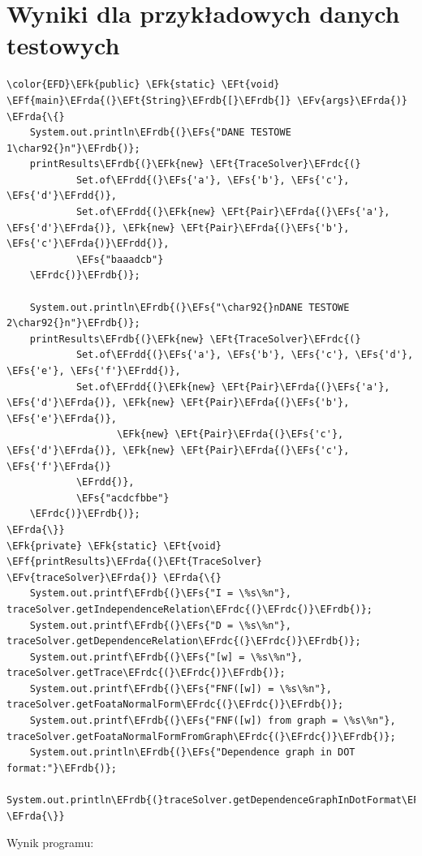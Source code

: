 \documentclass[11pt]{article}
\newcommand{\EFs}[1]{\textcolor{EFs}{#1}} %
\newcommand{\EFk}[1]{\textcolor{EFk}{#1}} %
\newcommand{\EFf}[1]{\textcolor{EFf}{#1}} %
\newcommand{\EFv}[1]{\textcolor{EFv}{#1}} %
\newcommand{\EFt}[1]{\textcolor{EFt}{#1}} %
\newcommand{\EFrda}[1]{#1} %
\newcommand{\EFrdb}[1]{\textcolor{EFrdb}{#1}} %
\newcommand{\EFrdc}[1]{\textcolor{EFrdc}{#1}} %
\newcommand{\EFrdd}[1]{\textcolor{EFrdd}{#1}} %
\begin{document}
\section*{Wyniki dla przykładowych danych testowych}
\label{sec:orga82053b}
\begin{Code}
\begin{Verbatim}
\color{EFD}\EFk{public} \EFk{static} \EFt{void} \EFf{main}\EFrda{(}\EFt{String}\EFrdb{[}\EFrdb{]} \EFv{args}\EFrda{)} \EFrda{\{}
    System.out.println\EFrdb{(}\EFs{"DANE TESTOWE 1\char92{}n"}\EFrdb{)};
    printResults\EFrdb{(}\EFk{new} \EFt{TraceSolver}\EFrdc{(}
            Set.of\EFrdd{(}\EFs{'a'}, \EFs{'b'}, \EFs{'c'}, \EFs{'d'}\EFrdd{)},
            Set.of\EFrdd{(}\EFk{new} \EFt{Pair}\EFrda{(}\EFs{'a'}, \EFs{'d'}\EFrda{)}, \EFk{new} \EFt{Pair}\EFrda{(}\EFs{'b'}, \EFs{'c'}\EFrda{)}\EFrdd{)},
            \EFs{"baaadcb"}
    \EFrdc{)}\EFrdb{)};

    System.out.println\EFrdb{(}\EFs{"\char92{}nDANE TESTOWE 2\char92{}n"}\EFrdb{)};
    printResults\EFrdb{(}\EFk{new} \EFt{TraceSolver}\EFrdc{(}
            Set.of\EFrdd{(}\EFs{'a'}, \EFs{'b'}, \EFs{'c'}, \EFs{'d'}, \EFs{'e'}, \EFs{'f'}\EFrdd{)},
            Set.of\EFrdd{(}\EFk{new} \EFt{Pair}\EFrda{(}\EFs{'a'}, \EFs{'d'}\EFrda{)}, \EFk{new} \EFt{Pair}\EFrda{(}\EFs{'b'}, \EFs{'e'}\EFrda{)},
                   \EFk{new} \EFt{Pair}\EFrda{(}\EFs{'c'}, \EFs{'d'}\EFrda{)}, \EFk{new} \EFt{Pair}\EFrda{(}\EFs{'c'}, \EFs{'f'}\EFrda{)}
            \EFrdd{)},
            \EFs{"acdcfbbe"}
    \EFrdc{)}\EFrdb{)};
\EFrda{\}}
\EFk{private} \EFk{static} \EFt{void} \EFf{printResults}\EFrda{(}\EFt{TraceSolver} \EFv{traceSolver}\EFrda{)} \EFrda{\{}
    System.out.printf\EFrdb{(}\EFs{"I = \%s\%n"}, traceSolver.getIndependenceRelation\EFrdc{(}\EFrdc{)}\EFrdb{)};
    System.out.printf\EFrdb{(}\EFs{"D = \%s\%n"}, traceSolver.getDependenceRelation\EFrdc{(}\EFrdc{)}\EFrdb{)};
    System.out.printf\EFrdb{(}\EFs{"[w] = \%s\%n"}, traceSolver.getTrace\EFrdc{(}\EFrdc{)}\EFrdb{)};
    System.out.printf\EFrdb{(}\EFs{"FNF([w]) = \%s\%n"}, traceSolver.getFoataNormalForm\EFrdc{(}\EFrdc{)}\EFrdb{)};
    System.out.printf\EFrdb{(}\EFs{"FNF([w]) from graph = \%s\%n"}, traceSolver.getFoataNormalFormFromGraph\EFrdc{(}\EFrdc{)}\EFrdb{)};
    System.out.println\EFrdb{(}\EFs{"Dependence graph in DOT format:"}\EFrdb{)};
    System.out.println\EFrdb{(}traceSolver.getDependenceGraphInDotFormat\EFrdc{(}\EFrdc{)}\EFrdb{)};
\EFrda{\}}
\end{Verbatim}
\end{Code}
Wynik programu:
\end{document}
